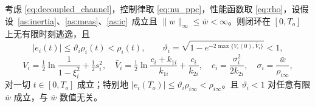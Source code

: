 \begin{theorem}[包络保持与预设时间进带]\label{thm:funnel}
考虑 \eqref{eq:decoupled_channel}，控制律取 \eqref{eq:nu_ppc}，性能函数取 \eqref{eq:rho}，设假设~\ref{as:inertia}、\ref{as:meas}、\ref{as:ic}~成立且 \(\lVert w\rVert_\infty\le\bar w<\infty\)。则闭环在 \([0,T_o]\) 上无有限时刻逃逸，且
\begin{equation}
\lvert e_i(t)\rvert\le\vartheta_i\rho_i(t)<\rho_i(t),\qquad
\vartheta_i=\sqrt{1-e^{-2\max\{V_i(0),\bar V_i\}}}<1,
\label{eq:funnel_bound}
\end{equation}
\begin{equation}
V_i=\tfrac12\ln\frac{1}{1-\xi_i^{2}}+\tfrac12 s_i^{2},\quad
\bar V_i=\tfrac12\ln\frac{c_i+k_{1i}}{k_{1i}}+\frac{c_i}{k_{2i}},\quad
c_i=\frac{\sigma_i^{2}}{2k_{2i}},\quad
\sigma_i=\frac{\bar w}{\rho_{i\infty}},
\label{eq:V_c}
\end{equation}
对一切 \(t\in[0,T_o]\) 成立；特别地 \(\lvert e_i(T_o)\rvert\le\vartheta_i\rho_{i\infty}<\rho_{i\infty}\)。且 \(\vartheta_i<1\) 对任意有限 \(\bar w\) 成立，与 \(\bar w\) 数值无关。
\end{theorem}

